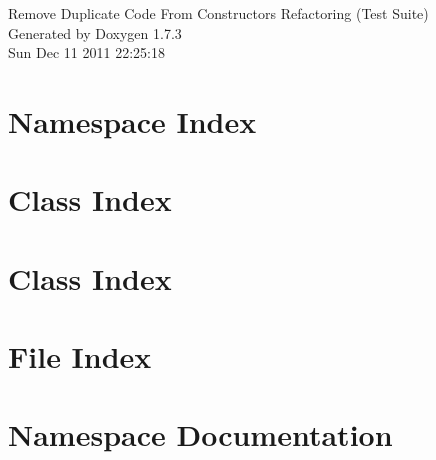 \documentclass[a4paper]{book}
\begin{document}
\hypersetup{pageanchor=false}
\begin{titlepage}
\vspace*{7cm}
\begin{center}
{\Large Remove Duplicate Code From Constructors Refactoring (Test Suite) }\\
\vspace*{1cm}
{\large Generated by Doxygen 1.7.3}\\
\vspace*{0.5cm}
{\small Sun Dec 11 2011 22:25:18}\\
\end{center}
\end{titlepage}
\clearemptydoublepage
{}
\tableofcontents
\clearemptydoublepage
{}
\hypersetup{pageanchor=true}
\chapter{Namespace Index}

\chapter{Class Index}

\chapter{Class Index}

\chapter{File Index}

\chapter{Namespace Documentation}











\end{document}
